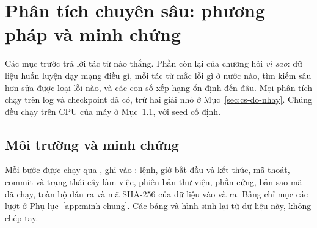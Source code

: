 \section{Phân tích chuyên sâu: phương pháp và minh chứng}
\label{sec:cs-phuong-phap}
Các mục trước trả lời tác tử nào thắng. Phần còn lại của chương hỏi \emph{vì sao}: dữ liệu huấn luyện dạy mạng điều
gì, mỗi tác tử mắc lỗi gì ở nước nào, tìm kiếm sâu hơn sửa được loại lỗi nào, và các con số xếp hạng ổn định đến
đâu. Mọi phân tích chạy trên log và checkpoint đã có, trừ hai giải nhỏ ở Mục~\ref{sec:cs-do-nhay}. Chúng đều chạy
trên CPU của máy ở Mục~\ref{sec:cs-moi-truong}, với seed cố định.

\subsection{Môi trường và minh chứng}
\label{sec:cs-moi-truong}
Mỗi bước được chạy qua , ghi vào
: lệnh, giờ bắt đầu và kết thúc, mã thoát, commit và trạng thái cây
làm việc, phiên bản thư viện, phần cứng, bản sao mã đã chạy, toàn bộ đầu ra và mã SHA-256 của dữ liệu vào và ra.
Bảng chỉ mục các lượt ở Phụ lục~\ref{app:minh-chung}. Các bảng và hình sinh lại từ dữ liệu này, không chép tay.

